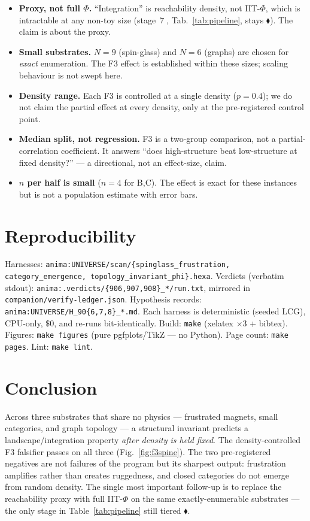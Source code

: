 \documentclass[11pt,a4paper]{article}
\providecommand{\tierOrange}{\textcolor{orange!85!black}{\ensuremath{\blacklozenge}}}
\begin{document}
\begin{itemize}\itemsep0.2em
\item \textbf{Proxy, not full $\Phi$.} ``Integration'' is reachability density,
      not IIT-$\Phi$, which is intractable at any non-toy size
      (stage~\textcircled{\scriptsize 7}, Tab.~\ref{tab:pipeline}, stays
      \tierOrange). The claim is about the proxy.
\item \textbf{Small substrates.} $N{=}9$ (spin-glass) and $N{=}6$ (graphs) are
      chosen for \emph{exact} enumeration. The F3 effect is established within
      these sizes; scaling behaviour is not swept here.
\item \textbf{Density range.} Each F3 is controlled at a single density
      ($p{=}0.4$); we do not claim the partial effect at every density, only at
      the pre-registered control point.
\item \textbf{Median split, not regression.} F3 is a two-group comparison, not a
      partial-correlation coefficient. It answers ``does high-structure beat
      low-structure at fixed density?'' --- a directional, not an effect-size,
      claim.
\item \textbf{$n$ per half is small} ($n{=}4$ for B,C). The effect is exact for
      these instances but is not a population estimate with error bars.
\end{itemize}

\section{Reproducibility}
\label{sec:repro}

Harnesses: \texttt{anima:UNIVERSE/scan/\{spinglass\_frustration, category\_emergence,
topology\_invariant\_phi\}.hexa}. Verdicts (verbatim stdout):
\texttt{anima:.verdicts/\{906,907,908\}\_*/run.txt}, mirrored in
\texttt{companion/verify-ledger.json}. Hypothesis records:
\texttt{anima:UNIVERSE/H\_90\{6,7,8\}\_*.md}. Each harness is deterministic
(seeded LCG), CPU-only, $\$0$, and re-runs bit-identically. Build:
\texttt{make} (xelatex $\times 3$ + bibtex). Figures: \texttt{make figures}
(pure pgfplots/TikZ --- no Python). Page count: \texttt{make pages}. Lint:
\texttt{make lint}.

\section{Conclusion}
\label{sec:conclusion}

Across three substrates that share no physics --- frustrated magnets, small
categories, and graph topology --- a structural invariant predicts a
landscape/integration property \emph{after density is held fixed}. The
density-controlled F3 falsifier passes on all three (Fig.~\ref{fig:f3spine}). The
two pre-registered negatives are not failures of the program but its sharpest
output: frustration amplifies rather than creates ruggedness, and closed
categories do not emerge from random density. The single most important
follow-up is to replace the reachability proxy with full IIT-$\Phi$ on the same
exactly-enumerable substrates --- the only stage in Table~\ref{tab:pipeline}
still tiered \tierOrange.
\end{document}
